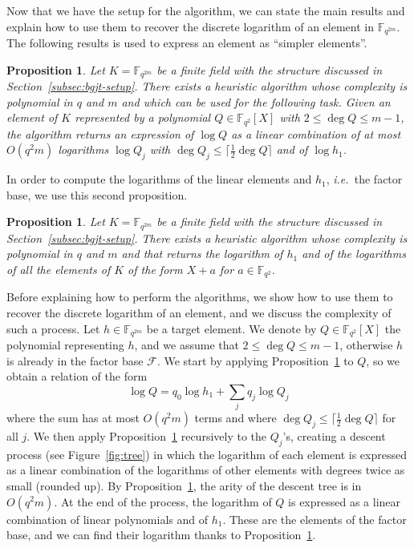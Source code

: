 \documentclass[a4paper,11pt]{article}
\theoremstyle{break}
\newtheorem{prop}[thm]{Proposition}
\theoremstyle{sc}
\theoremstyle{definition}
\theoremstyle{remark}
\newcommand{\ie}{\emph{i.e.\ }}
\begin{document}
Now that we have the setup for the algorithm, we can state the main results and
explain how to use them to recover the discrete logarithm of an element in
$\mathbb{F}_{q^{2m}}$. The following results is used to express an element as
``simpler elements''.

\begin{prop}
  \label{prop:bgjt}
  Let $K = \mathbb{F}_{q^{2m}}$ be a finite field with the structure discussed
  in Section~\ref{subsec:bgjt-setup}.
  There exists a heuristic algorithm whose complexity is polynomial in $q$ and
  $m$ and which can be used for the following task. Given an element of $K$ represented by a polynomial
  $Q\in\mathbb{F}_{q^2}[X]$ with $2\leq \deg Q \leq m-1$, the algorithm
  returns an expression of $\log Q$ as a linear combination of at most
  $O(q^2m)$ logarithms $\log Q_j$ with $\deg Q_j\leq
  \lceil\frac{1}{2}\deg Q\rceil$ and of $\log h_1$.
\end{prop}

In order to compute the logarithms of the linear elements and $h_1$, \ie the
factor base, we use this second proposition.

\begin{prop}
  \label{prop:bgjt2}
  Let $K = \mathbb{F}_{q^{2m}}$ be a finite field with the structure discussed
  in Section~\ref{subsec:bgjt-setup}.
  There exists a heuristic algorithm whose complexity is polynomial in $q$ and
  $m$ and that returns the logarithm of $h_1$ and of the logarithms of
  all the elements of $K$ of the form $X+a$ for $a\in\mathbb{F}_{q^2}$.
\end{prop}

Before explaining how to perform the algorithms,
we show how to use them to recover the discrete logarithm of an element, and we
discuss the complexity of such a process. Let $h\in\mathbb{F}_{q^{2m}}$ be a
target element. We denote by $Q\in\mathbb{F}_{q^2}[X]$ the polynomial
representing $h$, and we assume that $2\leq \deg Q\leq m-1$, otherwise $h$ is
already in the factor base $\mathcal F$. We start by applying
Proposition~\ref{prop:bgjt} to $Q$, so we obtain a relation of the form
\[
  \log Q = q_0\log h_1 + \sum_j q_j\log Q_j
\]
where the sum has at most $O(q^2m)$ terms and where $\deg
Q_j\leq\lceil\frac{1}{2}\deg Q\rceil$ for all $j$. We then apply
Proposition~\ref{prop:bgjt}
recursively to the $Q_j$'s, creating a descent process (see
Figure~\ref{fig:tree}) in which the logarithm of
each element is expressed as a linear combination of the logarithms of other
elements with degrees twice as small (rounded up). By Proposition~\ref{prop:bgjt}, the
arity of the descent tree is in $O(q^2m)$. At the end of the process, the
logarithm of $Q$ is expressed as a linear combination of linear polynomials and
of $h_1$. These are the elements of the factor base, and we can find their
logarithm thanks to Proposition~\ref{prop:bgjt2}.
\end{document}
